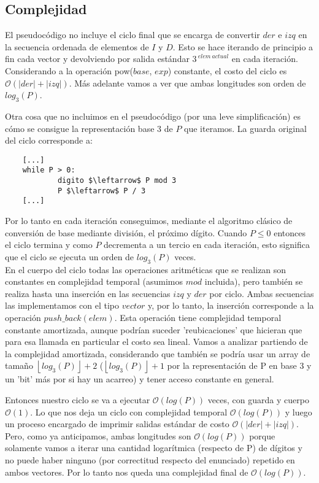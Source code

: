 \newpage
\subsection{Complejidad}
	El pseudocódigo no incluye el ciclo final que se encarga de convertir $der$ e $izq$ en la secuencia ordenada de elementos de $I$ y $D$. Esto se hace iterando de principio a fin cada vector y devolviendo por salida estándar $3^{\ elem \ actual}$ en cada iteración. Considerando a la operación pow($base$, $exp$) constante, el costo del ciclo es $\mathcal{O} (|der| + |izq|)$. Más adelante vamos a ver que ambas longitudes son orden de $log_3(P)$.

	Otra cosa que no incluimos en el pseudocódigo (por una leve simplificación) es cómo se consigue la representación base 3 de $P$ que iteramos. La guarda original del ciclo corresponde a:

	\begin{lstlisting}
	[...]
	while P > 0:
        	digito $\leftarrow$ P mod 3
        	P $\leftarrow$ P / 3
	[...]
	\end{lstlisting}

	Por lo tanto en cada iteración conseguimos, mediante el algoritmo clásico de conversión de base mediante división, el próximo dígito. Cuando $P \leq 0$ entonces el ciclo termina y como $P$ decrementa a un tercio en cada iteración, esto significa que el ciclo se ejecuta un orden de $log_3(P)$ veces.
	\\

	En el cuerpo del ciclo todas las operaciones aritméticas que se realizan son constantes en complejidad temporal (asumimos $mod$ incluida), pero también se realiza hasta una inserción en las secuencias $izq$ y $der$ por ciclo. Ambas secuencias las implementamos con el tipo $vector$ y, por lo tanto, la inserción corresponde a la operación $push\_back(elem)$. Esta operación tiene complejidad temporal constante amortizada, aunque podrían suceder 'reubicaciones' que hicieran que para esa llamada en particular el costo sea lineal. Vamos a analizar partiendo de la complejidad amortizada, considerando que también se podría usar un array de tamaño $\left \lfloor{log_3(P)}\right \rfloor + 2$ ($\left \lfloor{log_3(P)}\right \rfloor + 1$ por la representación de P en base 3 y un 'bit' más por si hay un acarreo) y tener acceso constante en general.

	Entonces nuestro ciclo se va a ejecutar $\mathcal{O} (log(P))$ veces, con guarda y cuerpo $\mathcal{O} (1)$. Lo que nos deja un ciclo con complejidad temporal $\mathcal{O} (log(P))$ y luego un proceso encargado de imprimir salidas estándar de costo $\mathcal{O} (|der| + |izq|)$. Pero, como ya anticipamos, ambas longitudes son $\mathcal{O} (log(P))$ porque solamente vamos a iterar una cantidad logarítmica (respecto de P) de dígitos y no puede haber ninguno (por correctitud respecto del enunciado) repetido en ambos vectores. Por lo tanto nos queda una complejidad final de $\mathcal{O} (log(P))$.
	\\

